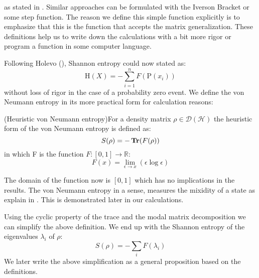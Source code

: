 as stated in \cite{holevo2012quantum}. Similar approaches can be formulated with the Iverson Bracket or some step function. The reason we define this simple function explicitly is to emphasize that this is the function that accepts the matrix generalization. These definitions help us to write down the calculations with a bit more rigor or program a function in some computer language.
\par
Following Holevo (\citep{holevo2012quantum}), Shannon entropy could now stated as:
\begin{equation}
\mathrm{H}(X)=-\sum_{i=1}^{n} F(\mathrm{P}\left(x_{i}\right))
\label{shanon2}
\end{equation}
without loss of rigor in the case of a probability zero event.
We define the von Neumann entropy in its more practical form for calculation reasons:
\begin{definition}(Heuristic von Neumann entropy)For a density matrix $\rho \in \mathcal{D}(\mathcal{H})$ the heuristic form of the von Neumann entropy is defined as:
\label{vonNeumanndef}
\begin{equation}
S(\rho)=-\operatorname{\textup{\textbf{Tr}}}(F(\rho))
\label{vonNeumann2}
\end{equation}
in which F is the function $F: [0,1] \rightarrow \mathbb{R}$: 
\begin{equation}
F(x)=\lim_{\epsilon \to x}(\epsilon \log \epsilon)
\end{equation}
\end{definition}
\noindent
The domain of the function now is $[0,1]$ which has no implications in the results. 
The von Neumann entropy in a sense, measures the mixidity of a state as explain in \cite{susskind2005introduction}. This is demonstrated later in our calculations. 
\par
Using the cyclic property of the trace and the modal matrix decomposition we can simplify the above definition. We end up with the Shannon entropy of the eigenvalues $\lambda_i$ of $\rho$:
\begin{equation}
S(\rho)=-\sum_{i} F(\lambda_i)
\end{equation}
\noindent
We later write the above simplification as a general proposition based on the definitions.

